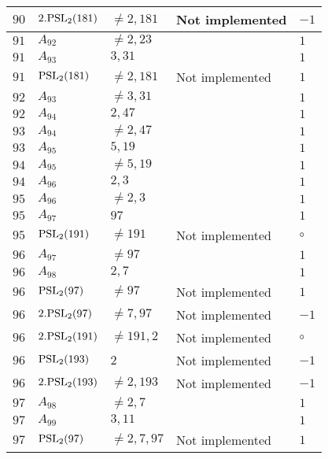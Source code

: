 \documentclass[a4paper, 11pt]{article}
\begin{document}
\begin{longtable}{lllll}
        $ 90 $ & $ 2.{\rm PSL}_{2}(181) $ & $ \neq 2, 181 $ & Not implemented & $ -1  $ \\ \hline
        $ 91 $ & $ A_{92} $ & $ \neq 2, 23 $ & $ ~ $ & $ 1  $ \\ \hline
        $ 91 $ & $ A_{93} $ & $ 3, 31 $ & $ ~ $ & $ 1  $ \\ \hline
        $ 91 $ & $ {\rm PSL}_{2}(181) $ & $ \neq 2, 181 $ & Not implemented & $ 1  $ \\ \hline
        $ 92 $ & $ A_{93} $ & $ \neq 3, 31 $ & $ ~ $ & $ 1  $ \\ \hline
        $ 92 $ & $ A_{94} $ & $ 2, 47 $ & $ ~ $ & $ 1  $ \\ \hline
        $ 93 $ & $ A_{94} $ & $ \neq 2, 47 $ & $ ~ $ & $ 1  $ \\ \hline
        $ 93 $ & $ A_{95} $ & $ 5, 19 $ & $ ~ $ & $ 1  $ \\ \hline
        $ 94 $ & $ A_{95} $ & $ \neq 5, 19 $ & $ ~ $ & $ 1  $ \\ \hline
        $ 94 $ & $ A_{96} $ & $ 2, 3 $ & $ ~ $ & $ 1  $ \\ \hline
        $ 95 $ & $ A_{96} $ & $ \neq 2, 3 $ & $ ~ $ & $ 1  $ \\ \hline
        $ 95 $ & $ A_{97} $ & $ 97 $ & $ ~ $ & $ 1  $ \\ \hline
        $ 95 $ & $ {\rm PSL}_{2}(191) $ & $ \neq 191 $ & Not implemented & $\circ$ \\ \hline
        $ 96 $ & $ A_{97} $ & $ \neq 97 $ & $ ~ $ & $ 1  $ \\ \hline
        $ 96 $ & $ A_{98} $ & $ 2, 7 $ & $ ~ $ & $ 1  $ \\ \hline
        $ 96 $ & $ {\rm PSL}_{2}(97) $ & $ \neq 97 $ & Not implemented & $ 1  $ \\ \hline
        $ 96 $ & $ 2.{\rm PSL}_{2}(97) $ & $ \neq 7, 97 $ & Not implemented & $ -1  $ \\ \hline
        $ 96 $ & $ 2.{\rm PSL}_{2}(191) $ & $ \neq 191, 2 $ & Not implemented & $\circ$ \\ \hline
        $ 96 $ & $ {\rm PSL}_{2}(193) $ & $ 2 $ & Not implemented & $ -1  $ \\ \hline
        $ 96 $ & $ 2.{\rm PSL}_{2}(193) $ & $ \neq 2, 193 $ & Not implemented & $ -1  $ \\ \hline
        $ 97 $ & $ A_{98} $ & $ \neq 2, 7 $ & $ ~ $ & $ 1  $ \\ \hline
        $ 97 $ & $ A_{99} $ & $ 3, 11 $ & $ ~ $ & $ 1  $ \\ \hline
        $ 97 $ & $ {\rm PSL}_{2}(97) $ & $ \neq 2, 7, 97 $ & Not implemented & $ 1  $ \\ \hline

\end{longtable}
\end{document}
